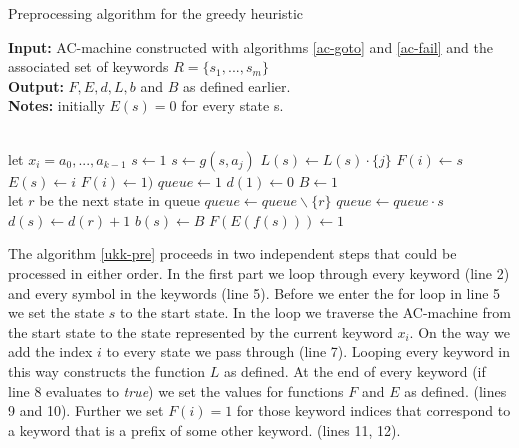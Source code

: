 \documentclass[english,twoside,censored,csm,algorithms-track-2020]{HYthesisML}
\theoremstyle{plain}
\theoremstyle{definition}
\begin{document}
  \begin{algorithm}[h]

    \caption{Preprocessing algorithm for the greedy heuristic} \label{ukk-pre}
    \hspace*{\algorithmicindent} \textbf{Input:} AC-machine constructed with algorithms \ref{ac-goto} and \ref{ac-fail} and the associated set of keywords $R=\{s_1,...,s_m\}$ \\
    \hspace*{\algorithmicindent} \textbf{Output:} $F, E, d, L, b$ and $B$ as defined earlier.\\
    \hspace*{\algorithmicindent} \textbf{Notes:} initially $E(s) = 0$ for every state s.
    
    \begin{algorithmic}[1]
         \\
          \hspace*{1.1cm plus \algorithmicindent} let $x_i = a_0,...,a_{k-1}$
          \State $s\gets 1$
            \State $s\gets g(s,a_j)$
            \State $L(s)\gets L(s) \cdot \{j\}$
              \State $F(i)\gets s$
              \State $E(s)\gets i$
                \State $F(i)\gets 1)$
              \EndIf
            \EndIf
          \EndFor
        \EndFor
        \State $queue\gets 1$
        \State $d(1)\gets 0$
        \State $B\gets 1$
        \\
          \hspace*{1.1cm plus \algorithmicindent} let $r$ be the next state in queue
          \State $queue\gets queue \backslash \{r\}$
            \State $queue\gets queue\cdot s$
            \State $d(s)\gets d(r)+1$
            \State $b(s)\gets B$
            \State $F(E(f(s)))\gets 1$
          \EndFor
        \EndWhile
      \EndFunction
        
    \end{algorithmic}
  \end{algorithm}


The algorithm \ref{ukk-pre} proceeds in two independent steps that could be processed in either order.
In the first part we loop through every keyword (line 2) and every symbol in the keywords (line 5).
Before we enter the for loop in line 5 we set the state $s$ to the start state. In the loop
we traverse the AC-machine from the start state to the state represented by the current keyword $x_i$.
On the way we add the index $i$ to every state we pass through (line 7). Looping every keyword in this
way constructs the function $L$ as defined. At the end of every keyword (if line 8 evaluates to
\textit{true}) we set the values for functions $F$ and $E$ as defined. (lines 9 and 10).
Further we set $F(i) = 1$ for those keyword indices that correspond to a keyword that is a prefix
of some other keyword. (lines 11, 12).
\end{document}
